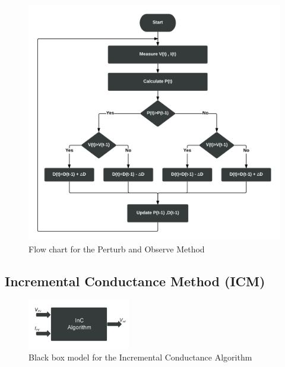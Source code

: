 {  \begin{figure}[H]
    \begin{center}
    \includegraphics[width=\textwidth]{images/pno_flow}
    \caption{Flow chart for the Perturb and Observe Method }
    \label{fig:PnO_flow}
    \end{center}
    \end{figure}
  
  \subsection{Incremental Conductance Method (ICM) } \label{sec:icm_sec}
  
  \begin{figure}[H]
         \begin{center}
         \includegraphics[width=0.4\textwidth]{images/inC_block}
         \caption{ Black box model for the Incremental Conductance Algorithm }
         \label{fig:inC_block}
    \end{center}
  \end{figure}
  
}
